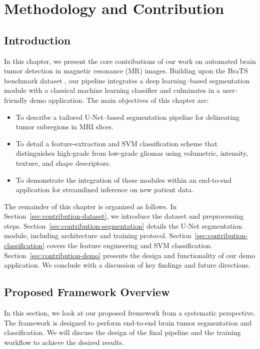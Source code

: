 \chapter{Methodology and Contribution}

\section{Introduction}
\label{sec:contribution-introduction}

In this chapter, we present the core contributions of our work on automated brain tumor detection in magnetic resonance (MR) images. Building upon the BraTS benchmark dataset \cite{Menze2015}, our pipeline integrates a deep learning–based segmentation module with a classical machine learning classifier and culminates in a user‐friendly demo application. The main objectives of this chapter are:
\begin{itemize}
  \item To describe a tailored U-Net–based segmentation pipeline for delineating tumor subregions in MRI slices.
  \item To detail a feature‐extraction and SVM classification scheme that distinguishes high‐grade from low‐grade gliomas using volumetric, intensity, texture, and shape descriptors.
  \item To demonstrate the integration of these modules within an end-to-end application for streamlined inference on new patient data.
\end{itemize}

The remainder of this chapter is organized as follows. In Section~\ref{sec:contribution-dataset}, we introduce the dataset and preprocessing steps. Section~\ref{sec:contribution-segmentation} details the U-Net segmentation module, including architecture and training protocol. Section~\ref{sec:contribution-classification} covers the feature engineering and SVM classification. Section~\ref{sec:contribution-demo} presents the design and functionality of our demo application. We conclude with a discussion of key findings and future directions.

\section{Proposed Framework Overview}
\label{sec:contribution-framework}
In this section, we look at our proposed fremework from a systematic perspective. The framework is designed to perform end-to-end brain tumor segmentation and classification. We will discuss the design of the final pipeline and the training workflow to achieve the desired results.

